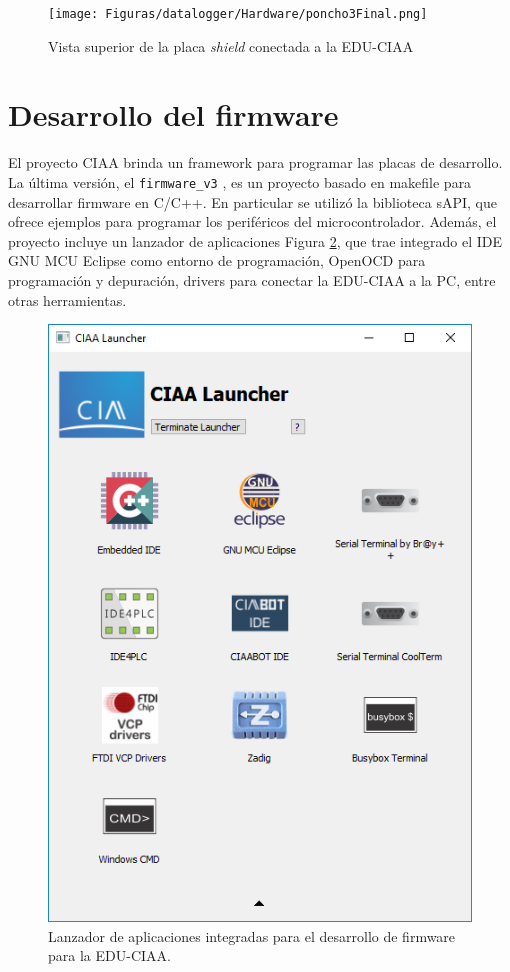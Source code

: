 




\begin{figure}[H]
    \centering
    \texttt{[image: Figuras/datalogger/Hardware/poncho3Final.png]}
    \caption{Vista superior de la placa \textit{shield} conectada a la EDU-CIAA}
    \label{fig:poncho3Final}
\end{figure}

\section{Desarrollo del firmware}\label{sec:desarrolloFirmware}

El proyecto CIAA brinda un framework para programar las placas de desarrollo. La última versión, el \texttt{firmware\_v3} \cite{ciaa2024}, es un proyecto basado en makefile para desarrollar firmware en C/C++. En particular se utilizó la biblioteca sAPI, que ofrece ejemplos para programar los periféricos del microcontrolador. Además, el proyecto incluye un lanzador de aplicaciones Figura \ref{fig:ciaaLauncher}, que trae integrado el IDE GNU MCU Eclipse como entorno de programación, OpenOCD para programación y depuración, drivers para conectar la EDU-CIAA a la PC, entre otras herramientas. 

\begin{figure}[H]
    \centering
    \includegraphics[width=0.35\linewidth]{Figuras/datalogger/Firmware/ciaaLauncher.png}
    \caption{Lanzador de aplicaciones integradas para el desarrollo de firmware para la EDU-CIAA.}
    \label{fig:ciaaLauncher}
\end{figure}


